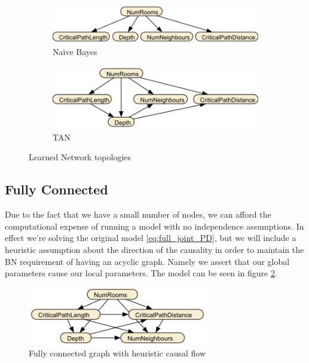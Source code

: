 \documentclass{UoYCSproject}
\begin{document}

\begin{figure}[htb]
  \centering
  \begin{subfigure}[b]{0.43\textwidth}
    \centering
    \includegraphics[width=\textwidth]{NBNet.png}
    \caption{Na\"{i}ve Bayes}
  \end{subfigure}
  \hfill
  \begin{subfigure}[b]{0.50\textwidth}
    \centering
    \includegraphics[width=\textwidth]{TANNet.png}
    \caption{TAN}
  \end{subfigure}
  \caption{Learned Network topologies}
  \label{fig:TAN}
\end{figure}


\subsection{Fully Connected}
Due to the fact that we have a small number of nodes, we can afford the computational expense of running a model with no independence assumptions. In effect we're solving the original model \ref{eq:full_joint_PD}, but we will include a heuristic assumption about the direction of the causality in order to maintain the BN requirement of having an acyclic graph. Namely we assert that our global parameters cause our local parameters. The model can be seen in figure \ref{fig:FullyConnected}.

\begin{figure}[htb]
  \centering
    \includegraphics[width=0.7\textwidth]{FullyConnected.png}
    \caption{Fully connected graph with heuristic causal flow}
  \label{fig:FullyConnected}
\end{figure}
\end{document}
